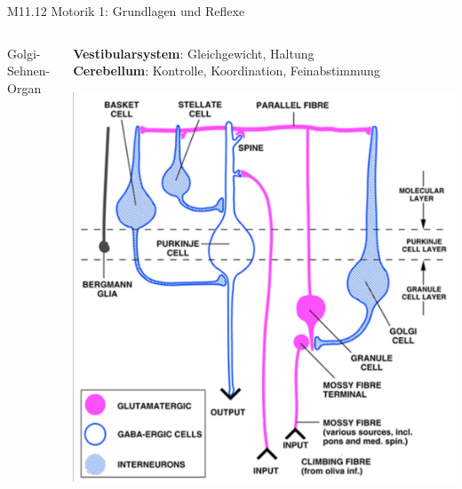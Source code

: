 \documentclass{beamer}
\begin{document}
\begin{frame}{M11.12 Motorik 1: Grundlagen und Reflexe}
\begin{columns}[c]
\begin{column}{5cm}
\begin{block}{Golgi-Sehnen-Organ}
\end{block}
\end{column}

\pause

\begin{column}{5cm}

\textbf{Vestibularsystem}: Gleichgewicht, Haltung  \\


\textbf{Cerebellum}: Kontrolle, Koordination, Feinabstimmung \\

\pause

\begin{center}
    \includegraphics[width=\textwidth]{cerebellum_layers.png}
\end{center}

\end{column}


\end{columns}


\end{frame}
\end{document}
